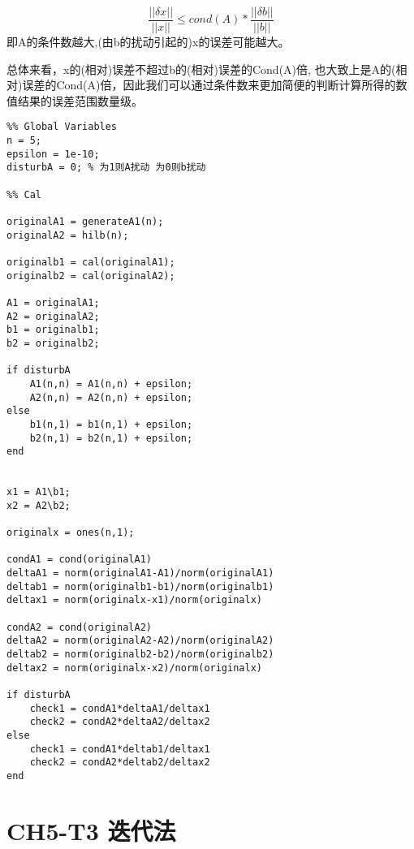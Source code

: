\documentclass{article}
\begin{document}
$$\frac{||\delta x||}{||x||} \leq cond(A)*\frac{||\delta b||}{||b||}$$
即A的条件数越大,(由b的扰动引起的)x的误差可能越大。

总体来看，x的(相对)误差不超过b的(相对)误差的Cond(A)倍, 也大致上是A的(相对)误差的Cond(A)倍，因此我们可以通过条件数来更加简便的判断计算所得的数值结果的误差范围数量级。
\begin{lstlisting}
%% Global Variables
n = 5;
epsilon = 1e-10;
disturbA = 0; % 为1则A扰动 为0则b扰动

%% Cal

originalA1 = generateA1(n);
originalA2 = hilb(n);

originalb1 = cal(originalA1);
originalb2 = cal(originalA2);

A1 = originalA1;
A2 = originalA2;
b1 = originalb1;
b2 = originalb2;

if disturbA
    A1(n,n) = A1(n,n) + epsilon;
    A2(n,n) = A2(n,n) + epsilon;
else
    b1(n,1) = b1(n,1) + epsilon;
    b2(n,1) = b2(n,1) + epsilon;
end


x1 = A1\b1;
x2 = A2\b2;

originalx = ones(n,1);

condA1 = cond(originalA1)
deltaA1 = norm(originalA1-A1)/norm(originalA1)
deltab1 = norm(originalb1-b1)/norm(originalb1)
deltax1 = norm(originalx-x1)/norm(originalx)

condA2 = cond(originalA2)
deltaA2 = norm(originalA2-A2)/norm(originalA2)
deltab2 = norm(originalb2-b2)/norm(originalb2)
deltax2 = norm(originalx-x2)/norm(originalx)

if disturbA
    check1 = condA1*deltaA1/deltax1
    check2 = condA2*deltaA2/deltax2
else 
    check1 = condA1*deltab1/deltax1
    check2 = condA2*deltab2/deltax2
end
\end{lstlisting}


\section{CH5-T3 迭代法}
\end{document}
